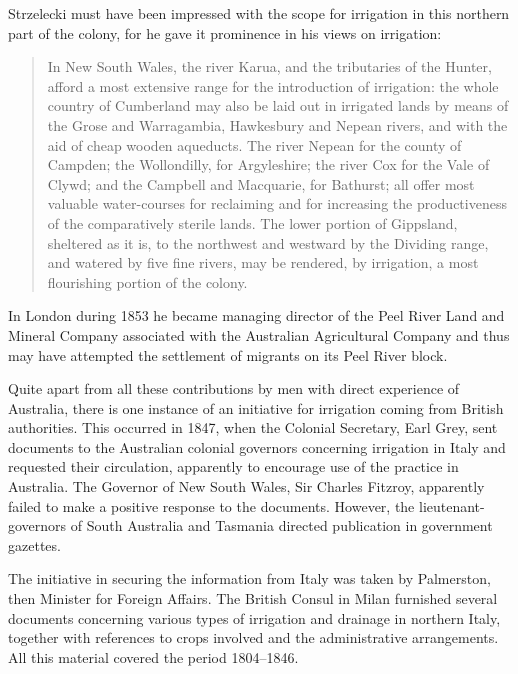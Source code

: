 Strzelecki must have been impressed with the scope for irrigation in
this northern part of the colony, for he gave it prominence in his
views on irrigation:
\begin{quote}
	In New South Wales, the river Karua, and the tributaries of
	the Hunter, afford a most extensive range for the introduction
	of irrigation: the whole country of Cumberland may also be
	laid out in irrigated lands by means of the Grose and
	Warragambia, Hawkesbury and Nepean rivers, and with the aid of
	cheap wooden aqueducts.  The river Nepean for the county of
	Campden; the Wollondilly, for Argyleshire; the river Cox for
	the Vale of Clywd; and the Campbell and Macquarie, for
	Bathurst; all offer most valuable water-courses for reclaiming
	and for increasing the productiveness of the comparatively
	sterile lands. The lower portion of Gippsland, sheltered as it
	is, to the northwest and westward by the Dividing range, and
	watered by five fine rivers, may be rendered, by irrigation, a
	most flourishing portion of the
	colony.
\end{quote}

In London during 1853 he became managing director of the Peel River
Land and Mineral Company associated with the Australian Agricultural
Company and thus may have attempted the settlement of migrants on its
Peel River block.

Quite apart from all these contributions by men with direct experience
of Australia, there is one instance of an initiative for irrigation
coming from British authorities.  This occurred in 1847, when the
Colonial Secretary, Earl Grey, sent documents to the Australian
colonial governors concerning irrigation in Italy and requested their
circulation, apparently to encourage use of the practice in Australia.
The Governor of New South Wales, Sir Charles Fitzroy, apparently
failed to make a positive response to the documents.  However, the
lieutenant-governors of South Australia and Tasmania directed
publication in government gazettes.


The initiative in securing the information from Italy was taken by
Palmerston, then Minister for Foreign Affairs.  The British Consul in
Milan furnished several documents concerning various types of
irrigation and drainage in northern Italy, together with references to
crops involved and the administrative arrangements.  All this material
covered the period 1804--1846.

